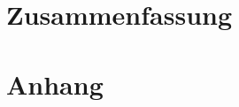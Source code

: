 \documentclass[
12pt,
a4paper,
bibliography=totocnumbered, %
BCOR=1cm, %
oneside, %
]{scrartcl}
\begin{document}
\section{Zusammenfassung}



\printbibliography

\section{Anhang}

%
\end{document}
